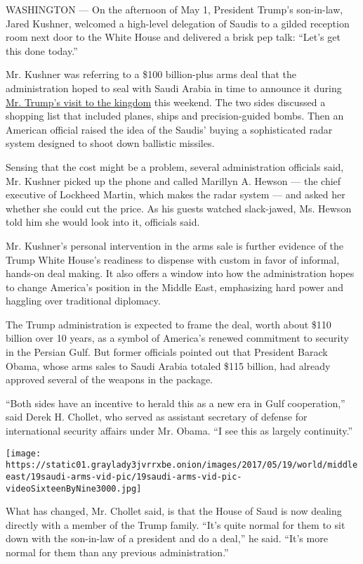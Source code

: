 WASHINGTON --- On the afternoon of May 1, President Trump's son-in-law,
Jared Kushner, welcomed a high-level delegation of Saudis to a gilded
reception room next door to the White House and delivered a brisk pep
talk: ``Let's get this done today.''

Mr. Kushner was referring to a \$100 billion-plus arms deal that the
administration hoped to seal with Saudi Arabia in time to announce it
during
\href{https://www.nytimes3xbfgragh.onion/2017/05/04/us/politics/trump-to-visit-saudi-arabia-and-israel-in-first-foreign-trip.html}{Mr.
Trump's visit to the kingdom} this weekend. The two sides discussed a
shopping list that included planes, ships and precision-guided bombs.
Then an American official raised the idea of the Saudis' buying a
sophisticated radar system designed to shoot down ballistic missiles.

Sensing that the cost might be a problem, several administration
officials said, Mr. Kushner picked up the phone and called Marillyn A.
Hewson --- the chief executive of Lockheed Martin, which makes the radar
system --- and asked her whether she could cut the price. As his guests
watched slack-jawed, Ms. Hewson told him she would look into it,
officials said.

Mr. Kushner's personal intervention in the arms sale is further evidence
of the Trump White House's readiness to dispense with custom in favor of
informal, hands-on deal making. It also offers a window into how the
administration hopes to change America's position in the Middle East,
emphasizing hard power and haggling over traditional diplomacy.

The Trump administration is expected to frame the deal, worth about
\$110 billion over 10 years, as a symbol of America's renewed commitment
to security in the Persian Gulf. But former officials pointed out that
President Barack Obama, whose arms sales to Saudi Arabia totaled \$115
billion, had already approved several of the weapons in the package.

``Both sides have an incentive to herald this as a new era in Gulf
cooperation,'' said Derek H. Chollet, who served as assistant secretary
of defense for international security affairs under Mr. Obama. ``I see
this as largely continuity.''

\texttt{[image: https://static01.graylady3jvrrxbe.onion/images/2017/05/19/world/middleeast/19saudi-arms-vid-pic/19saudi-arms-vid-pic-videoSixteenByNine3000.jpg]}

What has changed, Mr. Chollet said, is that the House of Saud is now
dealing directly with a member of the Trump family. ``It's quite normal
for them to sit down with the son-in-law of a president and do a deal,''
he said. ``It's more normal for them than any previous administration.''

